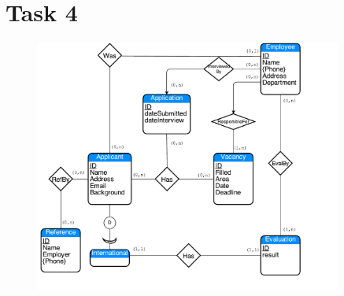 \documentclass[paper=a4, fontsize=11pt]{scrartcl} %
\numberwithin{equation}{section} %
\numberwithin{figure}{section} %
\numberwithin{table}{section} %
\begin{document}
\newpage
\section*{Task 4}

\begin{figure}[h!]
\centering
\includegraphics[width=0.9\textwidth]{oppg4.pdf}
\end{figure}
\end{document}
